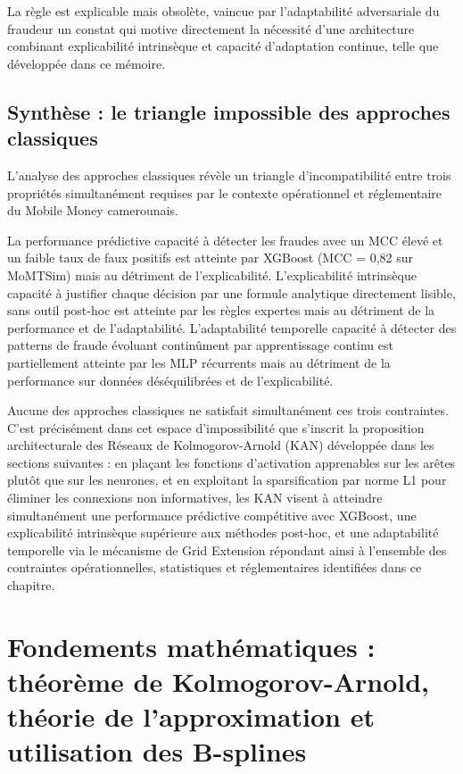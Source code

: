 \documentclass[11pt,a4paper,oneside]{report}
\theoremstyle{definition}
\theoremstyle{remark}
\begin{document}
La règle est explicable mais obsolète, vaincue par l'adaptabilité adversariale du fraudeur  un constat qui motive directement la nécessité d'une architecture combinant explicabilité intrinsèque et capacité d'adaptation continue, telle que développée dans ce mémoire.

\subsection{Synthèse : le triangle impossible des approches classiques}

L'analyse des approches classiques révèle un triangle d'incompatibilité entre trois propriétés simultanément requises par le contexte opérationnel et réglementaire du Mobile Money camerounais.

La performance prédictive  capacité à détecter les fraudes avec un MCC élevé et un faible taux de faux positifs  est atteinte par XGBoost (MCC = 0,82 sur MoMTSim) mais au détriment de l'explicabilité. L'explicabilité intrinsèque  capacité à justifier chaque décision par une formule analytique directement lisible, sans outil post-hoc  est atteinte par les règles expertes mais au détriment de la performance et de l'adaptabilité. L'adaptabilité temporelle  capacité à détecter des patterns de fraude évoluant continûment par apprentissage continu  est partiellement atteinte par les MLP récurrents mais au détriment de la performance sur données déséquilibrées et de l'explicabilité.

Aucune des approches classiques ne satisfait simultanément ces trois contraintes. C'est précisément dans cet espace d'impossibilité que s'inscrit la proposition architecturale des Réseaux de Kolmogorov-Arnold (KAN) développée dans les sections suivantes : en plaçant les fonctions d'activation apprenables sur les arêtes plutôt que sur les neurones, et en exploitant la sparsification par norme L1 pour éliminer les connexions non informatives, les KAN visent à atteindre simultanément une performance prédictive compétitive avec XGBoost, une explicabilité intrinsèque supérieure aux méthodes post-hoc, et une adaptabilité temporelle via le mécanisme de Grid Extension  répondant ainsi à l'ensemble des contraintes opérationnelles, statistiques et réglementaires identifiées dans ce chapitre.

\section{Fondements mathématiques : théorème de Kolmogorov-Arnold, théorie de l'approximation et utilisation des B-splines}
\end{document}
